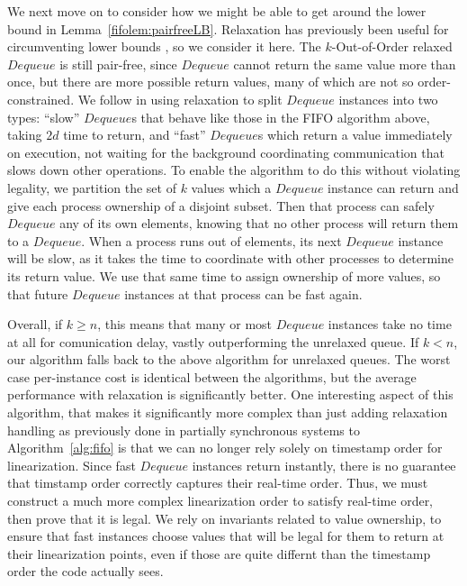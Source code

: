 \documentclass[a4paper,anonymous,USenglish]{lipics-v2021}
\theoremstyle{definition}
\begin{document}
We next move on to consider how we might be able to get around the lower bound in Lemma~\ref{fifolem:pairfreeLB}.  Relaxation has previously been useful for circumventing lower bounds \cite{TalmageWelch14}, so we consider it here.  The $k$-Out-of-Order relaxed $Dequeue$ is still pair-free, since $Dequeue$ cannot return the same value more than once, but there are more possible return values, many of which are not so order-constrained.  We follow \cite{TalmageWelch14} in using relaxation to split $Dequeue$ instances into two types: ``slow'' $Dequeue$s that behave like those in the FIFO algorithm above, taking $2d$ time to return, and ``fast'' $Dequeue$s which return a value immediately on execution, not waiting for the background coordinating communication that slows down other operations.  To enable the algorithm to do this without violating legality, we partition the set of $k$ values which a $Dequeue$ instance can return and give each process ownership of a disjoint subset.  Then that process can safely $Dequeue$ any of its own elements, knowing that no other process will return them to a $Dequeue$.  When a process runs out of elements, its next $Dequeue$ instance will be slow, as it takes the time to coordinate with other processes to determine its return value.  We use that same time to assign ownership of more values, so that future $Dequeue$ instances at that process can be fast again.

Overall, if $k \geq n$, this means that many or most $Dequeue$ instances take no time at all for comunication delay, vastly outperforming the unrelaxed queue.  If $k < n$, our algorithm falls back to the above algorithm for unrelaxed queues.  The worst case per-instance cost is identical between the algorithms, but the average performance with relaxation is significantly better.  One interesting aspect of this algorithm, that makes it significantly more complex than just adding relaxation handling as previously done in partially synchronous systems to Algorithm~\ref{alg:fifo} is that we can no longer rely solely on timestamp order for linearization.  Since fast $Dequeue$ instances return instantly, there is no guarantee that timstamp order correctly captures their real-time order.  Thus, we must construct a much more complex linearization order to satisfy real-time order, then prove that it is legal.  We rely on invariants related to value ownership, to ensure that fast instances choose values that will be legal for them to return at their linearization points, even if those are quite differnt than the timestamp order the code actually sees. 
\end{document}
